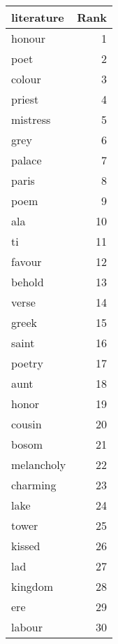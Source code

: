 \begin{table}
\label{tab:literature_terms}
\begin{tabular}{lr}
\toprule
literature & Rank \\
\midrule
honour & 1 \\
poet & 2 \\
colour & 3 \\
priest & 4 \\
mistress & 5 \\
grey & 6 \\
palace & 7 \\
paris & 8 \\
poem & 9 \\
ala & 10 \\
ti & 11 \\
favour & 12 \\
behold & 13 \\
verse & 14 \\
greek & 15 \\
saint & 16 \\
poetry & 17 \\
aunt & 18 \\
honor & 19 \\
cousin & 20 \\
bosom & 21 \\
melancholy & 22 \\
charming & 23 \\
lake & 24 \\
tower & 25 \\
kissed & 26 \\
lad & 27 \\
kingdom & 28 \\
ere & 29 \\
labour & 30 \\
\bottomrule
\end{tabular}
\end{table}
